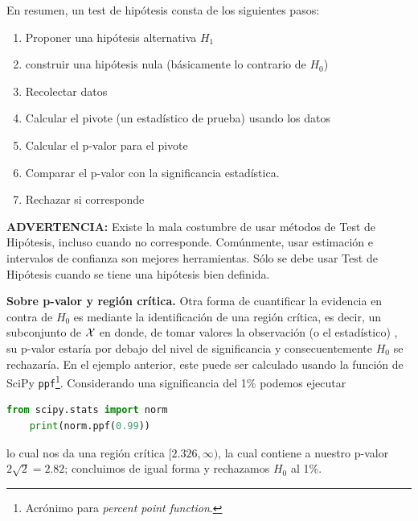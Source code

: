 \begin{tcolorbox}[title=Test de Hipótesis]
En resumen,  un test de hipótesis consta de los siguientes pasos: 

\begin{enumerate}
	\item Proponer una hipótesis alternativa $H_1$
	\item construir una hipótesis nula (básicamente lo contrario de $H_0$)
	\item Recolectar datos
	\item Calcular el pivote (un estadístico de prueba) usando los datos
	\item Calcular el p-valor para el pivote
	\item Comparar el p-valor con la significancia estadística. 
	\item Rechazar si corresponde
\end{enumerate}
\textbf{ADVERTENCIA: } Existe la mala costumbre de usar métodos de Test de Hipótesis, incluso cuando no corresponde. Comúnmente, usar estimación e intervalos de confianza son mejores herramientas. Sólo se debe usar Test de Hipótesis cuando se tiene una hipótesis bien definida.
\end{tcolorbox}

\textbf{Sobre p-valor y región crítica.}
Otra forma de cuantificar la evidencia en contra de $H_0$ es mediante la identificación de una región crítica, es decir, un subconjunto de ${\mathcal X}$ en donde, de tomar valores la observación (o el estadístico) , su p-valor estaría por debajo del nivel de significancia y consecuentemente $H_0$ se rechazaría. En el ejemplo anterior, este puede ser calculado usando la función de SciPy \texttt{ppf}\footnote{Acrónimo para \emph{percent point function}.}. Considerando una significancia del 1\% podemos ejecutar
\begin{lstlisting}[language=Python]
	from scipy.stats import norm
	print(norm.ppf(0.99))
\end{lstlisting}
lo cual nos da una región crítica $[2.326,\infty)$, la cual contiene a nuestro p-valor $2\sqrt{2} = 2.82$; concluimos de igual forma y rechazamos $H_0$ al 1\%. 

